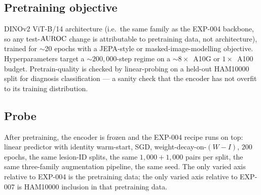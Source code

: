 \subsection{Pretraining objective}
DINOv2 ViT-B/14 architecture (i.e.\ the same family as the EXP-004
backbone, so any test-$\mathrm{AUROC}$ change is attributable to pretraining
data, not architecture), trained for $\sim$20 epochs with a JEPA-style
or masked-image-modelling objective. Hyperparameters target a
$\sim$$200{,}000$-step regime on a $\sim$$8\times$~A10G or
$1\times$~A100 budget. Pretrain-quality is checked by linear-probing on
a held-out HAM10000 split for diagnosis classification --- a sanity
check that the encoder has not overfit to its training distribution.

\subsection{Probe}
After pretraining, the encoder is frozen and the EXP-004 recipe runs on
top: linear predictor with identity warm-start, SGD, weight-decay-on-$(W-I)$,
$200$ epochs, the same lesion-ID splits, the same $1{,}000 + 1{,}000$
pairs per split, the same three-family augmentation pipeline, the same
seed. The only varied axis relative to EXP-004 is the pretraining
data; the only varied axis relative to EXP-007 is HAM10000 inclusion in
that pretraining data.

